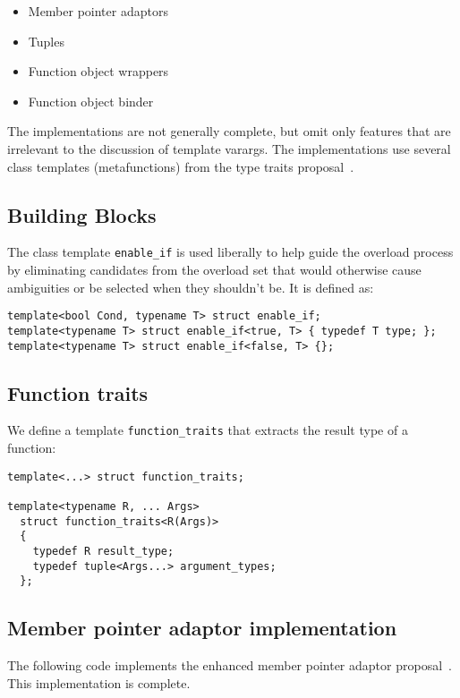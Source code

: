 \documentclass{article}
\begin{document}
\begin{itemize}
\item Member pointer adaptors~\cite{Dimov03a}
\item Tuples~\cite{Jarvi02}
\item Function object wrappers~\cite{Gregor02}
\item Function object binder~\cite{Dimov03b}
\end{itemize}

The implementations are not generally complete, but omit only features
that are irrelevant to the discussion of template varargs. The
implementations use several class templates (metafunctions) from the
type traits proposal~\cite{Maddock03}.

\subsection{Building Blocks}
\label{building_blocks}
The class template {\tt enable\_if} is used liberally to help guide
the overload process by eliminating candidates from the overload set
that would otherwise cause ambiguities or be selected when they
shouldn't be. It is defined as:

\begin{verbatim}
template<bool Cond, typename T> struct enable_if;
template<typename T> struct enable_if<true, T> { typedef T type; };
template<typename T> struct enable_if<false, T> {};
\end{verbatim}

\subsection{Function traits}
We define a template {\tt function\_traits} that extracts the result
type of a function:
\begin{verbatim}
template<...> struct function_traits;

template<typename R, ... Args> 
  struct function_traits<R(Args)>
  { 
    typedef R result_type; 
    typedef tuple<Args...> argument_types;
  };
\end{verbatim}

\subsection{Member pointer adaptor implementation}
\label{mem_fnimpl}
The following code implements the enhanced member pointer adaptor
proposal~\cite{Dimov03a}. This implementation is complete.
\end{document}
